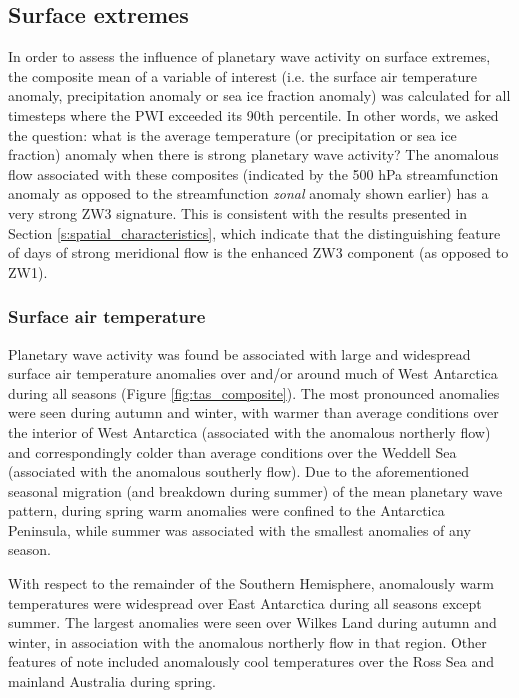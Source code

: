 \subsection{Surface extremes}\label{s:surface_extremes}

In order to assess the influence of planetary wave activity on surface extremes, the composite mean of a variable of interest (i.e. the surface air temperature anomaly, precipitation anomaly or sea ice fraction anomaly) was calculated for all timesteps where the PWI exceeded its 90th percentile. In other words, we asked the question: what is the average temperature (or precipitation or sea ice fraction) anomaly when there is strong planetary wave activity? The anomalous flow associated with these composites (indicated by the 500 hPa streamfunction anomaly as opposed to the streamfunction \textit{zonal} anomaly shown earlier) has a very strong ZW3 signature. This is consistent with the results presented in Section \ref{s:spatial_characteristics}, which indicate that the distinguishing feature of days of strong meridional flow is the enhanced ZW3 component (as opposed to ZW1).  

\subsubsection{Surface air temperature}

Planetary wave activity was found be associated with large and widespread surface air temperature anomalies over and/or around much of West Antarctica during all seasons (Figure \ref{fig:tas_composite}). The most pronounced anomalies were seen during autumn and winter, with warmer than average conditions over the interior of West Antarctica (associated with the anomalous northerly flow) and correspondingly colder than average conditions over the Weddell Sea (associated with the anomalous southerly flow). Due to the aforementioned seasonal migration (and breakdown during summer) of the mean planetary wave pattern, during spring warm anomalies were confined to the Antarctica Peninsula, while summer was associated with the smallest anomalies of any season.  

With respect to the remainder of the Southern Hemisphere, anomalously warm temperatures were widespread over East Antarctica during all seasons except summer. The largest anomalies were seen over Wilkes Land during autumn and winter, in association with the anomalous northerly flow in that region. Other features of note included anomalously cool temperatures over the Ross Sea and mainland Australia during spring.
